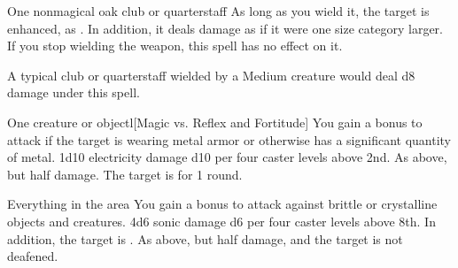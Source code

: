 \begin{spellheader}
    \spelldur{\durshort}
\end{spellheader}
\begin{spelleffects}
    \begin{spelltarget}{One nonmagical oak club or quarterstaff}
        \spelleffect As long as you wield it, the target is enhanced, as . In addition, it deals damage as if it were one size category larger. If you stop wielding the weapon, this spell has no effect on it.
    \end{spelltarget}
\end{spelleffects}
\begin{spellfooter}
    \spellnotes A typical club or quarterstaff wielded by a Medium creature would deal d8 damage under this spell.
\end{spellfooter}

\begin{spellheader}
\end{spellheader}
\begin{spelleffects}
    \begin{spelltarget}{One creature or object}l[Magic vs. Reflex and Fortitude]
        \spellspecial You gain a  bonus to attack if the target is wearing metal armor or otherwise has a significant quantity of metal.
        \spellsuccess[Reflex] 1d10 electricity damage \add d10 per four caster levels above 2nd.
        \spellfailure[Reflex] As above, but half damage.
         The target is \staggered for 1 round.
    \end{spelltarget}
\end{spelleffects}

\begin{spellheader}
\end{spellheader}
\begin{spelleffects}
    \begin{spelltargets}{Everything in the area}
        \spellspecial You gain a  bonus to attack against brittle or crystalline objects and creatures.
        \spellsuccess 4d6 sonic damage \add d6 per four caster levels above 8th. In addition, the target is \deafened.
        \spellfailure As above, but half damage, and the target is not deafened.
    \end{spelltargets}
\end{spelleffects}

